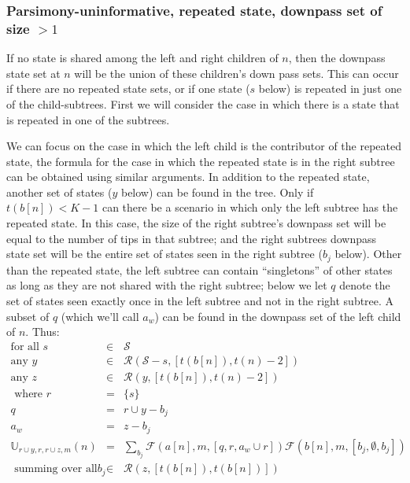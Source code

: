 \documentclass[11pt]{article}
\newcommand{\numStates}{\ensuremath{K}\xspace}
\newcommand{\allStates}{\ensuremath{\mathcal S}\xspace}
\newcommand{\probUninformPatClassSym}{\ensuremath{\mathbb U}\xspace}
\newcommand{\probUninformPatClass}[5]{\ensuremath{\probUninformPatClassSym_{#1,#2,#3,#4}\left(#5\right)}\xspace}
\newcommand{\leftChild}[1]{\ensuremath{a\left[#1\right]}\xspace} %
\newcommand{\rightChild}[1]{\ensuremath{b\left[#1\right]}\xspace}%
\newcommand{\numLeaves}[1]{\ensuremath{t\left(#1\right)}\xspace}
\newcommand{\subsetsOfSizeSet}[3]{\ensuremath{\mathcal R}\left(#1,\left[#2,#3\right]\right)\xspace}
\newcommand{\FelsensteinPruneSym}{{\mathcal{F}}}
\newcommand{\FelsensteinPruneUninform}[5]{\FelsensteinPruneSym(#1,#2,\left[#3,#4,#5\right])}
\begin{document}
\subsubsection{Parsimony-uninformative, repeated state, downpass set of size $> 1$}
If no state is shared among the left and right children of $n$, then the downpass state set at $n$ will be the union of these children's down pass sets.
This can occur if there are no repeated state sets, or if one state ($s$ below) is repeated in just one of the child-subtrees.
First we will consider the case in which there is a state that is repeated in one of the subtrees.

We can focus on the case in which the left child is the contributor of the repeated state, the formula for the case in which the repeated state is in the right subtree can be obtained using similar arguments.
In addition to the repeated state, another set of states ($y$ below) can be found in the tree.
Only if $\numLeaves{\rightChild{n}} < \numStates - 1$ can there be a scenario in which only the left subtree has the repeated state.
In this case, the size of the right subtree's downpass set will be equal to the number of tips in that subtree; and the right subtrees downpass state set will be the entire set of states seen in the right subtree ($b_j$ below).
Other than the repeated state, the left subtree can contain ``singletons'' of other states as long as they are not shared with the right subtree; below we let $q$ denote the set of states seen exactly once in the left subtree and not in the right subtree.
A subset of $q$ (which we'll call $a_w$) can be found in the downpass set of the left child of $n$.
Thus:
\begin{eqnarray*}
\mbox{for all } s & \in &  \allStates\\
\mbox{any } y & \in &  \subsetsOfSizeSet{\allStates-s}{\numLeaves{\rightChild{n}}}{\numLeaves{n} - 2}\\
\mbox{any } z & \in &  \subsetsOfSizeSet{y}{\numLeaves{\rightChild{n}}}{\numLeaves{n} - 2}\\
\mbox{ where }r & =&  \{s\}   \nonumber \\
q &  = & r \cup y - b_j\\
a_w & = & z-b_j\\
\probUninformPatClass{r\cup y }{r}{r\cup z}{m}{n} &= & \sum_{b_j}\FelsensteinPruneUninform{\leftChild{n}}{m}{q}{r}{a_w\cup r } \FelsensteinPruneUninform{\rightChild{n}}{m}{b_j}{\emptyset}{b_j}\\
\mbox{ summing over all } b_j & \in & \subsetsOfSizeSet{z}{\numLeaves{\rightChild{n}}}{\numLeaves{\rightChild{n}}} \\
\end{eqnarray*}
\end{document}
